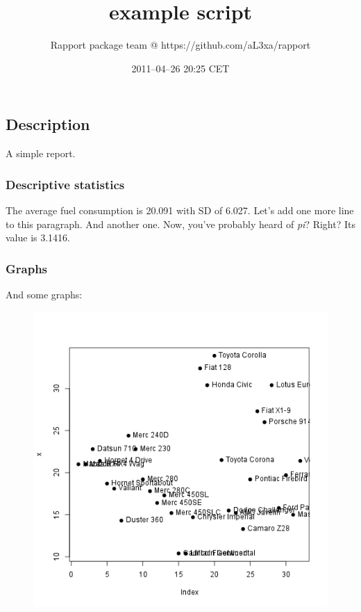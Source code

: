 \documentclass{article}
\title{example script}
\author{Rapport package team @ https://github.com/aL3xa/rapport}
\date{2011--04--26 20:25 CET}
\makeatletter
\def\maxwidth{\ifdim\Gin@nat@width>\linewidth\linewidth
\else\Gin@nat@width\fi}
\let\Oldincludegraphics\includegraphics
\renewcommand{\includegraphics}[1]{\Oldincludegraphics[width=\maxwidth]{#1}}
\makeatother
\begin{document}
\maketitle

\subsection{Description}

A simple report.

\subsubsection{Descriptive statistics}

The average fuel consumption is 20.091 with SD of 6.027. Let's add one
more line to this paragraph. And another one. Now, you've probably heard
of \emph{pi}? Right? Its value is 3.1416.

\subsubsection{Graphs}

And some graphs:

\begin{figure}[htbp]
\centering
\includegraphics{bcc0dbaf4a393aacd8f480329c88e68f.png}
\caption{}
\end{figure}
\end{document}
